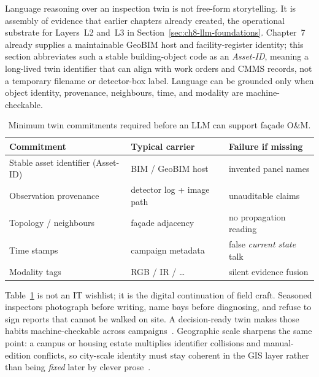Language reasoning over an inspection twin is not free-form storytelling. It is assembly of evidence that earlier chapters already created, the operational substrate for Layers~L2 and~L3 in Section~\ref{sec:ch8-llm-foundations}. Chapter~7 already supplies a maintainable GeoBIM host and facility-register identity; this section abbreviates such a stable building-object code as an \emph{Asset-ID}, meaning a long-lived twin identifier that can align with work orders and CMMS records, not a temporary filename or detector-box label. Language can be grounded only when object identity, provenance, neighbours, time, and modality are machine-checkable.

\begin{table}[htbp]
\centering
\caption{Minimum twin commitments required before an LLM can support fa\c{c}ade O\&M.}
\label{tab:ch8-twin-contract}
\begin{tabular}{llp{5.4cm}}
\toprule
Commitment & Typical carrier & Failure if missing \\
\midrule
Stable asset identifier (Asset-ID) & BIM / GeoBIM host & invented panel names \\
Observation provenance & detector log + image path & unauditable claims \\
Topology / neighbours & fa\c{c}ade adjacency & no propagation reading \\
Time stamps & campaign metadata & false \emph{current state} talk \\
Modality tags & RGB / IR / \ldots & silent evidence fusion \\
\bottomrule
\end{tabular}
\end{table}

Table~\ref{tab:ch8-twin-contract} is not an IT wishlist; it is the digital continuation of field craft. Seasoned inspectors photograph before writing, name bays before diagnosing, and refuse to sign reports that cannot be walked on site. A decision-ready twin makes those habits machine-checkable across campaigns~\cite{zhang2022,chen2023facility}. Geographic scale sharpens the same point: a campus or housing estate multiplies identifier collisions and manual-edition conflicts, so city-scale identity must stay coherent in the GIS layer rather than being \emph{fixed} later by clever prose~\cite{zhang2025,han2025}.

